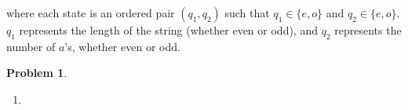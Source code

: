 \documentclass[11pt]{article}
\theoremstyle{definition}
\theoremstyle{case}
\theoremstyle{theorem}
\newtheorem{prob}{Problem}
\begin{document}
\begin{enumerate}[label=(\alph*)]
\begin{tikzpicture}[x=0.75pt,y=0.75pt,yscale=-1,xscale=1]
\end{tikzpicture}

where each state is an ordered pair $(q_1, q_2)$ such that $q_1 \in \{e, o\}$ and $q_2 \in \{e, o\}$. 
$q_1$ represents the length of the string (whether even or odd), and 
$q_2$ represents the number of $a$'s, whether even or odd.

\end{enumerate}

\newpage

\begin{prob}\end{prob}

\begin{enumerate}[label=(\alph*)]

\item
\begin{tikzpicture}[x=0.75pt,y=0.75pt,yscale=-1,xscale=1]


\end{tikzpicture}
\end{enumerate}
\end{document}

